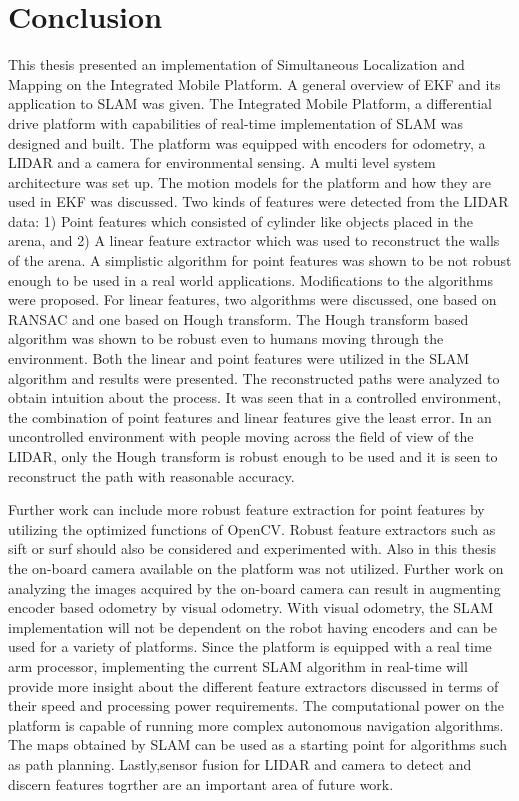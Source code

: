 \chapter{Conclusion}
\label{cha:conclusion}
This thesis presented an implementation of Simultaneous Localization and Mapping on the Integrated Mobile Platform. A general overview of EKF and its application to SLAM was given. The Integrated Mobile Platform, a differential drive platform with capabilities of real-time implementation of SLAM was designed and built. The platform was equipped with encoders for odometry, a LIDAR and a camera for environmental sensing. A multi level system architecture was set up. The motion models for the platform and how they are used in EKF was discussed. Two kinds of features were detected from the LIDAR data: 1) Point features which consisted of cylinder like objects placed in the arena, and 2) A linear feature extractor which was used to reconstruct the walls of the arena. A simplistic algorithm for point features was shown to be not robust enough to be used in a real world applications. Modifications to the algorithms were proposed. For linear features, two algorithms were discussed, one based on RANSAC and one based on Hough transform. The Hough transform based algorithm was shown to be robust even to humans moving through the environment. Both the linear and point features were utilized in the SLAM algorithm and results were presented. The reconstructed paths were analyzed to obtain intuition about the process. It was seen that in a controlled environment, the combination of point features and linear features give the least error. In an uncontrolled environment with people moving across the field of view of the LIDAR, only the Hough transform is robust enough to be used and it is seen to reconstruct the path with reasonable accuracy. 


Further work can include more robust feature extraction for point features by utilizing the optimized functions of OpenCV. Robust feature extractors such as sift or surf should also be considered and experimented with. Also in this thesis the on-board camera available on the platform was not utilized. Further work on analyzing the images acquired by the on-board camera can result in augmenting encoder based odometry by visual odometry. With visual odometry, the SLAM implementation will not be dependent on the robot having encoders and can be used for a variety of platforms. Since the platform is equipped with a real time arm processor, implementing the current SLAM algorithm in real-time will provide more insight about the different feature extractors discussed in terms of their speed and processing power requirements. The computational power on the platform is capable of running more complex autonomous navigation algorithms. The maps obtained by SLAM can be used as a starting point for algorithms such as path planning. Lastly,sensor fusion for LIDAR and camera to detect and discern features togrther are an important area of future work.
